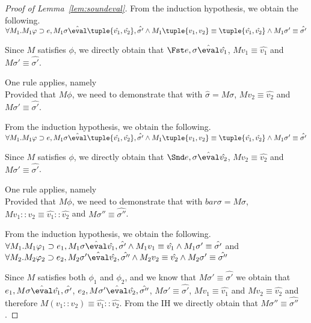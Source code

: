 \begin{proof}[Proof of Lemma~\ref{lem:soundeval}]
{  From the induction hypothesis, we obtain the following.\\
  $\forall M_1 . M_1\phi \implies e, M_1\sigma\hat{\eval}\tuple{\hat{v_1},\hat{v_2}},\hat{\sigma'}\land M_1\tuple{v_1,v_2}\equiv \tuple{\hat{v_1},\hat{v_2}}\land M_1\sigma'\equiv\hat{\sigma'}$

  Since $M$ satisfies $\phi$,
  we directly obtain that $\Fst e,\sigma\hat{\eval}\hat{v_1}$,
  $M v_1\equiv \hat{v_1}$ and $M\sigma'\equiv\hat{\sigma'}$.
  }

{ One rule applies, namely \\
  Provided that $M\phi$,
  we need to demonstrate that  with $\hat{\sigma}=M\sigma$,
  $M v_2\equiv \hat{v_2}$ and $M\sigma'\equiv\hat{\sigma'}$.

  From the induction hypothesis, we obtain the following.\\
  $\forall M_1 . M_1\phi \implies e, M_1\sigma\hat{\eval}\tuple{\hat{v_1},\hat{v_2}},\hat{\sigma'}\land M_1\tuple{v_1,v_2}\equiv \tuple{\hat{v_1},\hat{v_2}}\land M_1\sigma'\equiv\hat{\sigma'}$

  Since $M$ satisfies $\phi$,
  we directly obtain that $\Snd e,\sigma\hat{\eval}\hat{v_2}$,
  $M v_2\equiv \hat{v_2}$ and $M\sigma'\equiv\hat{\sigma'}$.
  }

  {One rule applies, namely \\
  Provided that $M\phi$,
  we need to demonstrate that  with $bar{\sigma}=M\sigma$,
  $M v_1::v_2\equiv \hat{v_1}::\hat{v_2}$ and $M\sigma''\equiv\hat{\sigma''}$.

  From the induction hypothesis, we obtain the following.\\
  $\forall M_1 .  M_1\phi_1 \implies e_1, M_1\sigma \hat{\eval}\hat{v_1},\hat{\sigma'}\land  M_1v_1\equiv \hat{v_1} \land  M_1\sigma'\equiv\hat{\sigma'}$ and
  $\forall M_2 . M_2\phi_2 \implies e_2,M_2\sigma' \hat{\eval}\hat{v_2},\hat{\sigma''}\land M_2v_2\equiv \hat{v_2} \wedge M_2\sigma'\equiv\hat{\sigma''}$

  Since $M$ satisfies both $\phi_1$ and $\phi_2$,
  and we know that $M\sigma'\equiv \hat{\sigma'}$
  we obtain that $e_1,M\sigma \hat{\eval}\hat{v_1},\hat{\sigma'}$,
  $e_2,M\sigma'\hat{\eval}\hat{v_2},\hat{\sigma''}$, $M\sigma'\equiv \hat{\sigma'}$,
 $M v_1\equiv \hat{v_1}$ and $M v_2 \equiv \hat{v_2}$ and therefore $M(v_1::v_2) \equiv \hat{v_1}::\hat{v_2}$.
  From the IH we directly obtain that $M \sigma'' \equiv\hat{\sigma''}$.}


\end{proof}
